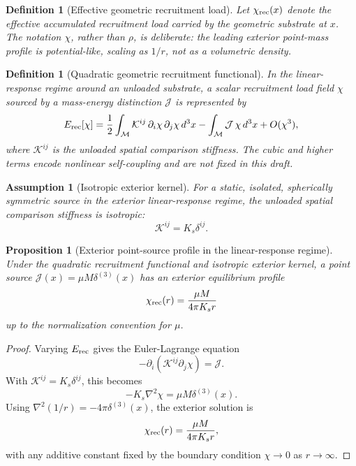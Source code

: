 \documentclass[11pt]{article}
\newtheorem{proposition}[theorem]{Proposition}
\newtheorem{definition}[theorem]{Definition}
\newtheorem{assumption}[theorem]{Assumption}
\theoremstyle{remark}
\newcommand{\Erec}{E_{\rm rec}}
\newcommand{\Kgeom}{\mathcal K}
\newcommand{\Mgeom}{\mathcal M}
\newcommand{\Jsrc}{\mathcal J}
\begin{document}
\begin{definition}[Effective geometric recruitment load]
Let \(\chi_{\rm rec}(x)\) denote the effective accumulated recruitment load carried by the geometric substrate at \(x\).  The notation \(\chi\), rather than \(\rho\), is deliberate: the leading exterior point-mass profile is potential-like, scaling as \(1/r\), not as a volumetric density.
\end{definition}

\begin{definition}[Quadratic geometric recruitment functional]
In the linear-response regime around an unloaded substrate, a scalar recruitment load field \(\chi\) sourced by a mass-energy distinction \(\Jsrc\) is represented by
\[
        \Erec[\chi]
        =
        \frac12\int_{\Mgeom} \Kgeom^{ij}\,\partial_i\chi\,\partial_j\chi\,d^3x
        -
        \int_{\Mgeom} \Jsrc\,\chi\,d^3x
        + O(\chi^3),
\]
where \(\Kgeom^{ij}\) is the unloaded spatial comparison stiffness.  The cubic and higher terms encode nonlinear self-coupling and are not fixed in this draft.
\end{definition}

\begin{assumption}[Isotropic exterior kernel]
For a static, isolated, spherically symmetric source in the exterior linear-response regime, the unloaded spatial comparison stiffness is isotropic:
\[
        \Kgeom^{ij}=K_s\delta^{ij}.
\]
\end{assumption}

\begin{proposition}[Exterior point-source profile in the linear-response regime]
\label{prop:point-source-profile}
Under the quadratic recruitment functional and isotropic exterior kernel, a point source \(\Jsrc(x)=\mu M\delta^{(3)}(x)\) has an exterior equilibrium profile
\[
        \chi_{\rm rec}(r)=\frac{\mu M}{4\pi K_s r}
\]
up to the normalization convention for \(\mu\).
\end{proposition}

\begin{proof}
Varying \(\Erec\) gives the Euler-Lagrange equation
\[
        -\partial_i(\Kgeom^{ij}\partial_j\chi)=\Jsrc.
\]
With \(\Kgeom^{ij}=K_s\delta^{ij}\), this becomes
\[
        -K_s\nabla^2\chi=\mu M\delta^{(3)}(x).
\]
Using \(\nabla^2(1/r)=-4\pi\delta^{(3)}(x)\), the exterior solution is
\[
        \chi_{\rm rec}(r)=\frac{\mu M}{4\pi K_s r},
\]
with any additive constant fixed by the boundary condition \(\chi\to0\) as \(r\to\infty\).
\end{proof}
\end{document}
